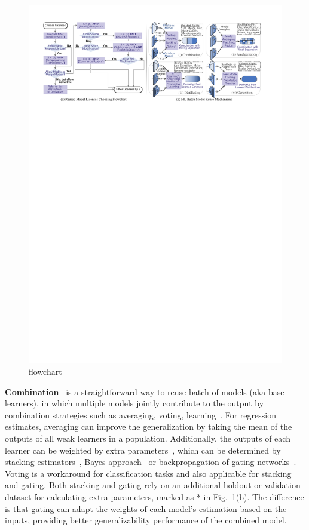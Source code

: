 \begin{figure}[t]
    \centering
    \includegraphics[width=\linewidth]{fig/flowchart.pdf}
    \caption{flowchart}
    \Description{}
    \label{fig:flowchart}
\end{figure}

\textbf{Combination}~\cite{zhou2012ensemble} is a straightforward way to reuse batch of models (aka base learners), in which multiple models jointly contribute to the output by combination strategies such as averaging, voting, learning~\cite{jacobs1991adaptive, wolpert1992stacked}.
For regression estimates, averaging can improve the generalization by taking the mean of the outputs of all weak learners in a population. Additionally, the outputs of each learner can be weighted by extra parameters~\cite{perrone1995networks}, which can be determined by stacking estimators~\cite{wolpert1992stacked}, Bayes approach~\cite{clarke2003comparing} or backpropagation of gating networks~\cite{jacobs1991adaptive}. 
Voting is a workaround for classification tasks and also applicable for stacking and gating.
Both stacking and gating rely on an additional holdout or validation dataset for calculating extra parameters, marked as * in Fig.~\ref{fig:flowchart}(b). 
The difference is that gating can adapt the weights of each model's estimation based on the inputs, providing better generalizability performance of the combined model.

